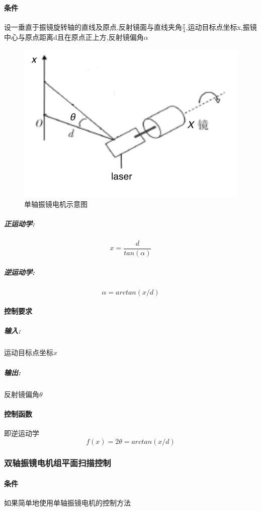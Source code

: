 \documentclass[a4paper,12pt,onecolumn,twoside]{article}
\begin{document}
\paragraph{条件}
设一垂直于振镜旋转轴的直线及原点,反射镜面与直线夹角$\frac{\pi}{4}$,运动目标点坐标x,振镜中心与原点距离d且在原点正上方,反射镜偏角$\alpha$
\begin{figure}[htbp]
\centering     
\includegraphics[width=\linewidth]{MG3.png}
\caption{单轴振镜电机示意图}
\end{figure}
\subparagraph{正运动学:}
\begin{equation}
x=\frac{d}{tan(\alpha)} 
\end{equation}
\subparagraph{逆运动学:}
\begin{equation}
\alpha = arctan(x/d)
\end{equation}
\paragraph{控制要求}
\subparagraph{输入:}
运动目标点坐标$x$
\subparagraph{输出:}
反射镜偏角$\theta$
\paragraph{控制函数}即逆运动学
\begin{equation}
f(x)=2\theta = arctan(x/d)
\end{equation}
\clearpage
\subsubsection{双轴振镜电机组平面扫描控制}

\paragraph{条件}
如果简单地使用单轴振镜电机的控制方法
\end{document}
